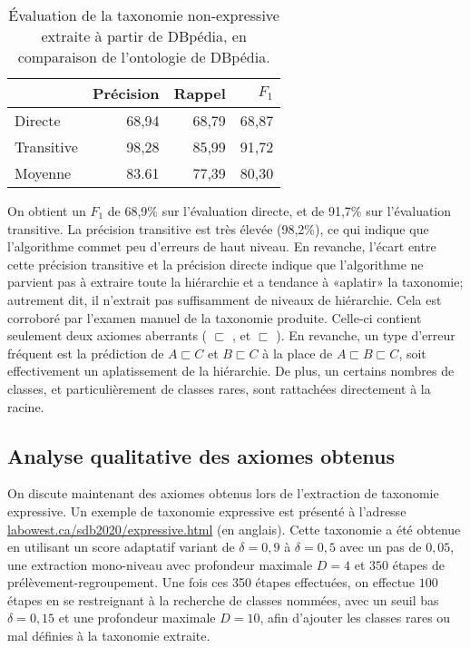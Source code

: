 \begin{table}[h]
    \centering
    \caption[Évaluation de la taxonomie non-expressive extraite sur DBpédia]{Évaluation de la taxonomie non-expressive extraite à partir de DBpédia, en comparaison de l'ontologie de DBpédia.}
    \begin{tabular}{|lrrr|}
        \hline
             & Précision  & Rappel & $F_1$ \\
        \hline
        Directe   &	68,94	&	68,79	&	68,87 \\
        Transitive  &	98,28	&	85,99	&	91,72 \\
        Moyenne & 83.61 & 77,39 & 80,30 \\
        \hline
    \end{tabular}
    \label{tab:extraction-results}
\end{table}

On obtient un $F_1$ de 68,9\% sur l'évaluation directe, et de 91,7\% sur l'évaluation transitive. La précision transitive est très élevée (98,2\%), ce qui indique que l'algorithme commet peu d'erreurs de haut niveau. En revanche, l'écart entre cette précision transitive et la précision directe indique que l'algorithme ne parvient pas à extraire toute la hiérarchie et a tendance à «aplatir» la taxonomie; autrement dit, il n'extrait pas suffisamment de niveaux de hiérarchie. Cela est corroboré par l'examen manuel de la taxonomie produite. Celle-ci contient seulement deux axiomes aberrants ( $\sqsubset$ , et  $\sqsubset$ ). En revanche, un type d'erreur fréquent est la prédiction de $A \sqsubset C$ et $B \sqsubset C$ à la place de $A \sqsubset B \sqsubset C$, soit effectivement un aplatissement de la hiérarchie. De plus, un certains nombres de classes, et particulièrement de classes rares, sont rattachées directement à la racine.




\subsection{Analyse qualitative des axiomes obtenus}
\label{subsec:texp-reslts-quali}

On discute maintenant des axiomes obtenus lors de l'extraction de taxonomie expressive. Un exemple de taxonomie expressive est présenté à l'adresse \href{http://labowest.ca/sdb2020/expressive.html}{labowest.ca/sdb2020/expressive.html} (en anglais). Cette taxonomie a été obtenue en utilisant un score adaptatif variant de $\delta = 0,9$ à $\delta = 0,5$ avec un pas de $0,05$, une extraction mono-niveau avec profondeur maximale $D=4$ et $350$ étapes de prélèvement-regroupement. Une fois ces 350 étapes effectuées, on effectue $100$ étapes en se restreignant à la recherche de classes nommées, avec un seuil bas $\delta = 0,15$ et une profondeur maximale $D=10$, afin d'ajouter les classes rares ou mal définies à la taxonomie extraite.

